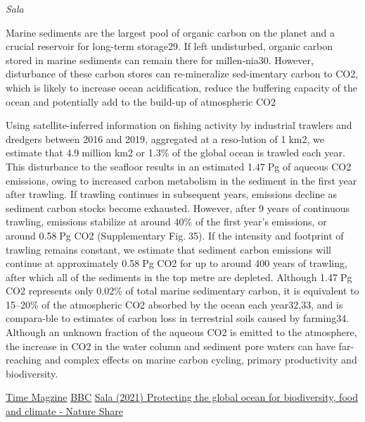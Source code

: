 \documentclass[
]{book}
\begin{document}
\emph{Sala}

Marine sediments are the largest pool of organic carbon on the planet and a crucial reservoir for long-term storage29. If left undisturbed, organic carbon stored in marine sediments can remain there for millen-nia30. However, disturbance of these carbon stores can re-mineralize sed-imentary carbon to CO2, which is likely to increase ocean acidification, reduce the buffering capacityof the ocean and potentially add to the build-up of atmospheric CO2

Using satellite-inferred information on fishing activity by industrial trawlers and dredgers between 2016 and 2019, aggregated at a reso-lution of 1km2, we estimate that 4.9million km2 or 1.3\% of the global ocean is trawled each year. This disturbance to the seafloor results in an estimated 1.47Pg of aqueous CO2 emissions, owing to increased carbon metabolism in the sediment in the first year after trawling. If trawling continues in subsequent years, emissions decline as sediment
carbon stocks become exhausted. However, after 9 years of continuous trawling, emissions stabilize at around 40\% of the first year's emissions, or around 0.58Pg CO2 (Supplementary Fig.35). If the intensity and footprint of trawling remains constant, we estimate that sediment carbon emissions will continue at approximately 0.58Pg CO2 for up to around 400 years of trawling, after which all of the sediments in the top metre are depleted. Although 1.47Pg CO2 represents only 0.02\% of total marine sedimentary carbon, it is equivalent to 15--20\% of the atmospheric CO2 absorbed by the ocean each year32,33, and is compara-ble to estimates of carbon loss in terrestrial soils caused by farming34. Although an unknown fraction of the aqueous CO2 is emitted to the atmosphere, the increase in CO2 in the water column and sediment pore waters can have far-reaching and complex effects on marine carbon cycling, primary productivity and biodiversity.

\href{https://time.com/5947430/bottom-trawling-carbon-emissions-study/}{Time Magzine}
\href{https://www.bbc.com/news/science-environment-56430542}{BBC}
\href{https://www.nature.com/articles/s41586-021-03371-z.epdf?sharing_token=6Sow3BIdqBYvlWAiGEDpk9RgN0jAjWel9jnR3ZoTv0MwjSp_dqdYRo11ccDn9dqPW5D1xJuK8fpT__q4KFNUwr3chDwJyG9IO5W1aWFy5onfZKtxUPkvQTnzNtoVopyg-N66E6j3SdEzqNh2UnnVHpANtYD9CYy7I3QNIz6iI184RD1jaDt2fU8Yl8bdsQppKG7J6tfBiSTN74eTrygUTMPeqTv4M1289Ys38rtf2Cu5Gfo8iuQxzcCwuSri_N3NIdmY-iR2Af8IOP_F9-p_RA\%3D\%3D\&tracking_referrer=time.com}{Sala (2021) Protecting the global ocean for biodiversity, food and climate - Nature Share}
\end{document}
